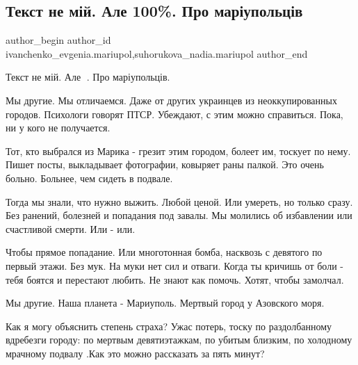  
 
 
 
 

\subsection{Текст не мій. Але 100\%. Про маріупольців}
\label{sec:31_05_2022.fb.ivanchenko_evgenia.mariupol.1.tekst_ne_m_i__ale_10}
 
\ifcmt
 author_begin
   author_id ivanchenko_evgenia.mariupol,suhorukova_nadia.mariupol
 author_end
\fi

Текст не мій. Але 💯. Про маріупольців.

Мы другие. Мы отличаемся. Даже от других украинцев из неоккупированных городов.
Психологи говорят ПТСР. Убеждают, с этим можно справиться. Пока, ни у кого не
получается. 

Тот, кто выбрался из Марика - грезит этим городом, болеет им, тоскует по
нему. Пишет посты, выкладывает фотографии, ковыряет раны палкой. Это очень
больно. Больнее, чем сидеть в подвале. 

Тогда мы знали, что нужно выжить. Любой ценой. Или умереть, но только сразу.
Без ранений, болезней и попадания под завалы. Мы молились об избавлении или
счастливой смерти. Или - или. 

Чтобы прямое попадание. Или многотонная бомба, насквозь с девятого по первый
этажи.  Без мук. На муки нет сил и отваги. Когда ты кричишь от боли -  тебя
боятся и перестают любить. Не знают как помочь. Хотят, чтобы замолчал.

Мы другие. Наша планета -  Мариуполь. Мертвый город у Азовского моря.

Как я могу объяснить степень страха?  Ужас потерь, тоску по раздолбанному
вдребезги городу: по  мертвым девятиэтажкам, по убитым  близким, по холодному
мрачному подвалу .Как это можно рассказать за пять минут? 

